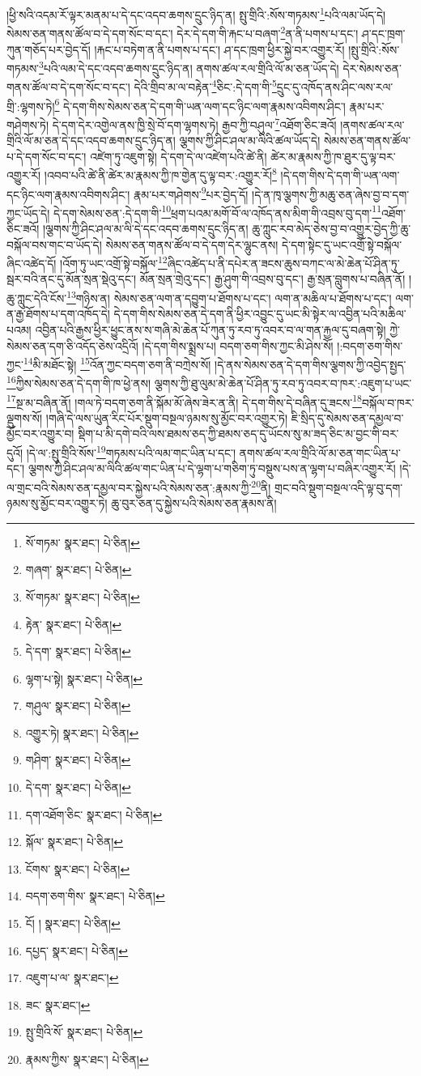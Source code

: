 །ཕྱི་སའི་འདམ་རོ་ལྟར་མནམ་པ་དེ་དང་འདབ་ཆགས་དྲུང་ཉིད་ན། སྤུ་གྲིའི་:སོས་གཏམས་\footnote{སོ་གཏམ་  སྣར་ཐང་།  པེ་ཅིན། }པའི་ལམ་ཡོད་དེ། སེམས་ཅན་གནས་ཚོལ་བ་དེ་དག་སོང་བ་དང་། དེར་དེ་དག་གི་རྐང་པ་བཞག་\footnote{གཞག་  སྣར་ཐང་།  པེ་ཅིན། }ན་ནི་པགས་པ་དང་། ཤ་དང་ཁྲག་ཀུན་གཅོད་པར་བྱེད་དོ། །རྐང་པ་བཏེག་ན་ནི་པགས་པ་དང་། ཤ་དང་ཁྲག་ཕྱིར་སྐྱེ་བར་འགྱུར་རོ། །སྤུ་གྲིའི་:སོས་གཏམས་\footnote{སོ་གཏམ་  སྣར་ཐང་།  པེ་ཅིན། }པའི་ལམ་དེ་དང་འདབ་ཆགས་དྲུང་ཉིད་ན། ནགས་ཚལ་རལ་གྲིའི་ལོ་མ་ཅན་ཡོད་དེ། དེར་སེམས་ཅན་གནས་ཚོལ་བ་དེ་དག་སོང་བ་དང་། དེའི་གྲིབ་མ་ལ་བརྟེན་\footnote{རྟེན་  སྣར་ཐང་།  པེ་ཅིན། }ཅིང་:དེ་དག་གི་\footnote{དེ་དག་  སྣར་ཐང་།  པེ་ཅིན། }དྲུང་དུ་འཁོད་ནས་ཤིང་ལས་རལ་གྲི་:ལྷགས་ཏེ།\footnote{ལྷག་པ་སྟེ།  སྣར་ཐང་།  པེ་ཅིན། } དེ་དག་གིས་སེམས་ཅན་དེ་དག་གི་ཡན་ལག་དང་ཉིང་ལག་རྣམས་འབིགས་ཤིང་། རྣམ་པར་གཤེགས་ཏེ། དེ་དག་དེར་འགྱེལ་ནས་ཁྱི་སྲེ་བོ་དག་ལྷགས་ཏེ། རྒྱབ་ཀྱི་བཤུལ་\footnote{གཤུལ་  སྣར་ཐང་།  པེ་ཅིན། }འཐོག་ཅིང་ཟའོ། །ནགས་ཚལ་རལ་གྲིའི་ལོ་མ་ཅན་དེ་དང་འདབ་ཆགས་དྲུང་ཉིད་ན། ལྕགས་ཀྱི་ཤིང་ཤལ་མ་ལིའི་ཚལ་ཡོད་དེ། སེམས་ཅན་གནས་ཚོལ་པ་དེ་དག་སོང་བ་དང་། འཛེག་ཏུ་འཇུག་སྟེ། དེ་དག་དེ་ལ་འཛེག་པའི་ཚེ་ནི། ཚེར་མ་རྣམས་ཀྱི་ཁ་ཐུར་དུ་ལྟ་བར་འགྱུར་རོ། །འབབ་པའི་ཚེ་ནི་ཚེར་མ་རྣམས་ཀྱི་ཁ་གྱེན་དུ་ལྟ་བར་:འགྱུར་རོ།\footnote{འགྱུར་ཏེ།  སྣར་ཐང་།  པེ་ཅིན། } །དེ་དག་གིས་དེ་དག་གི་ཡན་ལག་དང་ཉིང་ལག་རྣམས་འབིགས་ཤིང་། རྣམ་པར་གཤེགས་\footnote{གཤིག་  སྣར་ཐང་།  པེ་ཅིན། }པར་བྱེད་དོ། །དེ་ན་ཁྭ་ལྕགས་ཀྱི་མཆུ་ཅན་ཞེས་བྱ་བ་དག་ཀྱང་ཡོད་དེ། དེ་དག་སེམས་ཅན་:དེ་དག་གི་\footnote{དེ་དག་  སྣར་ཐང་།  པེ་ཅིན། }ཕྲག་པའམ་མགོ་བོ་ལ་འཁོད་ནས་མིག་གི་འབྲས་བུ་དག་\footnote{དག་འཐོག་ཅིང་  སྣར་ཐང་།  པེ་ཅིན། }འཐོག་ཅིང་ཟའོ། །ལྕགས་ཀྱི་ཤིང་ཤལ་མ་ལི་དེ་དང་འདབ་ཆགས་དྲུང་ཉིད་ན། ཆུ་ཀླུང་རབ་མེད་ཅེས་བྱ་བ་འགྱུར་བྱེད་ཀྱི་ཆུ་བསྐོལ་བས་གང་བ་ཡོད་དེ། སེམས་ཅན་གནས་ཚོལ་བ་དེ་དག་དེར་ལྷུང་ནས། དེ་དག་སྟེང་དུ་ཡང་འགྲོ་སྟེ་བསྐོལ་ཞིང་འཚེད་དོ། །འོག་ཏུ་ཡང་འགྲོ་སྟེ་བསྐོལ་\footnote{སྐོལ་  སྣར་ཐང་།  པེ་ཅིན། }ཞིང་འཚེད་པ་ནི་དཔེར་ན་ཟངས་ཆུས་བཀང་ལ་མེ་ཆེན་པོ་ཤིན་ཏུ་སྦར་བའི་ནང་དུ་མོན་སྲན་སྡེའུ་དང་། མོན་སྲན་གྲེའུ་དང་། རྒྱ་ཤུག་གི་འབྲས་བུ་དང་། རྒྱ་སྲན་བླུགས་པ་བཞིན་ནོ། །ཆུ་ཀླུང་དེའི་ངོས་\footnote{ངོགས་  སྣར་ཐང་།  པེ་ཅིན། }གཉིས་ན། སེམས་ཅན་ལག་ན་དབྱུག་པ་ཐོགས་པ་དང་། ལག་ན་མཆིལ་པ་ཐོགས་པ་དང་། ལག་ན་རྒྱ་ཐོགས་པ་དག་འཁོད་དེ། དེ་དག་གིས་སེམས་ཅན་དེ་དག་ནི་ཕྱིར་འབྱུང་དུ་ཡང་མི་སྟེར་ལ་འབྱིན་པའི་མཆིལ་པའམ། འབྱིན་པའི་རྒྱས་ཕྱིར་ཕྱུང་ནས་ས་གཞི་མེ་ཆེན་པོ་ཀུན་ཏུ་རབ་ཏུ་འབར་བ་ལ་གན་རྐྱལ་དུ་བཞག་སྟེ། ཀྱེ་སེམས་ཅན་དག་ཅི་འདོད་ཅེས་འདྲིའོ། །དེ་དག་གིས་སྨྲས་པ། བདག་ཅག་གིས་ཀྱང་མི་ཤེས་སོ། །:བདག་ཅག་གིས་ཀྱང་\footnote{བདག་ཅག་གིས་  སྣར་ཐང་།  པེ་ཅིན། }མི་མཐོང་སྟེ། \footnote{ངོ། །   སྣར་ཐང་།  པེ་ཅིན། }འོན་ཀྱང་བདག་ཅག་ནི་བཀྲེས་སོ། །དེ་ནས་སེམས་ཅན་དེ་དག་གིས་ལྕགས་ཀྱི་འབྱེད་སྤྱད་\footnote{དཔྱད་  སྣར་ཐང་།  པེ་ཅིན། }ཀྱིས་སེམས་ཅན་དེ་དག་གི་ཁ་ཕྱེ་ནས། ལྕགས་ཀྱི་ཐུ་ལུམ་མེ་ཆེན་པོ་ཤིན་ཏུ་རབ་ཏུ་འབར་བ་ཁར་:འཇུག་པ་ཡང་\footnote{འཇུག་པ་ལ་  སྣར་ཐང་། }སྔ་མ་བཞིན་ནོ། །གལ་ཏེ་བདག་ཅག་ནི་སྐོམ་མོ་ཞེས་ཟེར་ན་ནི། དེ་དག་གིས་དེ་བཞིན་དུ་ཟངས་\footnote{ཟང་  སྣར་ཐང་། }བསྐོལ་བ་ཁར་ལྡུགས་སོ། །གཞི་དེ་ལས་ཡུན་རིང་པོར་སྡུག་བསྔལ་ཉམས་སུ་མྱོང་བར་འགྱུར་ཏེ། ཇི་སྲིད་དུ་སེམས་ཅན་དམྱལ་བ་མྱོང་བར་འགྱུར་བ། སྡིག་པ་མི་དགེ་བའི་ལས་ཐམས་ཅད་ཀྱི་ཐམས་ཅད་དུ་ཡོངས་སུ་མ་ཟད་ཅིང་མ་བྱང་གི་བར་དུའོ། །དེ་ལ་:སྤུ་གྲིའི་སོས་\footnote{སྤུ་གྲིའི་སོ་  སྣར་ཐང་།  པེ་ཅིན། }གཏམས་པའི་ལམ་གང་ཡིན་པ་དང་། ནགས་ཚལ་རལ་གྲིའི་ལོ་མ་ཅན་གང་ཡིན་པ་དང་། ལྕགས་ཀྱི་ཤིང་ཤལ་མ་ལིའི་ཚལ་གང་ཡིན་པ་དེ་ལྷག་པ་གཅིག་ཏུ་བསྡུས་པས་ན་ལྷག་པ་བཞིར་འགྱུར་རོ། །དེ་ལ་གྲང་བའི་སེམས་ཅན་དམྱལ་བར་སྐྱེས་པའི་སེམས་ཅན་:རྣམས་ཀྱི་\footnote{རྣམས་ཀྱིས་  སྣར་ཐང་།  པེ་ཅིན། }ནི། གྲང་བའི་སྡུག་བསྔལ་འདི་ལྟ་བུ་དག་ཉམས་སུ་མྱོང་བར་འགྱུར་ཏེ། ཆུ་བུར་ཅན་དུ་སྐྱེས་པའི་སེམས་ཅན་རྣམས་ནི། 
